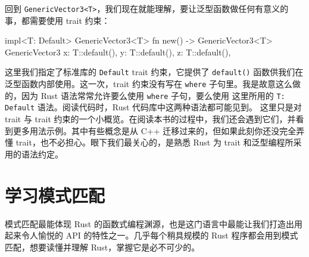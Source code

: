 回到 \texttt{GenericVector3<\allowbreak{}T>\allowbreak{}}，我们现在就能理解，要让泛型函数做任何有意义的事，都需要使用 trait 约束：
\begin{codebox}[rust]
impl<T: Default> GenericVector3<T> {
    fn new() -> GenericVector3<T> {
        GenericVector3 {
            x: T::default(),
            y: T::default(),
            z: T::default(),
        }
    }
}
\end{codebox}
\label{idx:idx_88c21155}
\label{idx:idx_8b2f0846}
这里我们指定了标准库的 \texttt{Default} trait 约束，它提供了 \texttt{default()} 函数供我们在泛型函数内部使用。这一次，trait 约束没有写在
\texttt{where} 子句里。我是故意这么做的，因为 Rust 语法常常允许要么使用 \texttt{where} 子句，要么使用
这里所用的 \texttt{T: Default} 语法。阅读代码时，Rust 代码库中这两种语法都可能见到。
这里只是对 trait 与 trait 约束的一个小概览。在阅读本书的过程中，我们还会遇到它们，并看到更多用法示例。其中有些概念是从 C++ 迁移过来的，但如果此刻你还没完全弄懂 trait，也不必担心。眼下我们最关心的，是熟悉 Rust 为 trait 和泛型编程所采用的语法约定。
\section{学习模式匹配}
\label{idx:idx_0cd1d764}
\label{idx:idx_eebf7284}
模式匹配最能体现 Rust 的函数式编程渊源，也是这门语言中最能让我们打造出用起来令人愉悦的 API 的特性之一。几乎每个稍具规模的 Rust 程序都会用到模式匹配，想要读懂并理解 Rust，掌握它是必不可少的。
